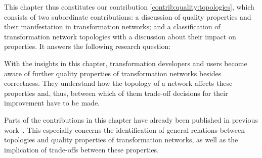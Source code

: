 This chapter thus constitutes our contribution \autoref{contrib:quality:topologies}, which consists of two subordinate contributions: a discussion of quality properties and their manifestation in transformation networks; and a classification of transformation network topologies with a discussion about their impact on properties.
It answers the following research question:


With the insights in this chapter, transformation developers and users become aware of further quality properties of transformation networks besides correctness.
They understand how the topology of a network affects these properties and, thus, between which of them trade-off decisions for their improvement have to be made.

Parts of the contributions in this chapter have already been published in previous work~.
This especially concerns the identification of general relations between topologies and quality properties of transformation networks, as well as the implication of trade-offs between these properties.





